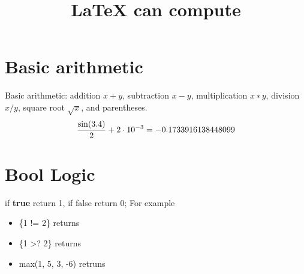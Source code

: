 \documentclass{article}
\title{\LaTeX{} can compute}
\begin{document}
\maketitle


\section{Basic arithmetic}
Basic arithmetic: addition $x+y$, subtraction $x − y$, multiplication $x ∗ y$, division $x/y$, square root
$\sqrt{x}$, and parentheses.
\[
	\frac{\sin(3.4)}{2} + 2\cdot 10^{-3} =  \fpeval{sin(3.5)/2 + 2e-3}
\]

\section{Bool Logic}
if {\bf true} return 1, if {\sf false} return 0; For example

\begin{itemize}
\item \{1 != 2\} returns 
\item \{1 >? 2\} returns 
\item max(1, 5, 3, -6) retruns 
\end{itemize}
\end{document}
